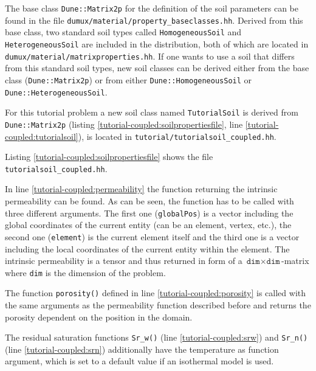 The base class \texttt{Dune::Matrix2p} for the definition of the soil
parameters can be found in the file
\texttt{dumux/material/property\_baseclasses.hh}. Derived from this
base class, two standard soil types called \texttt{HomogeneousSoil}
and \texttt{HeterogeneousSoil} are included in the \Dumux
distribution, both of which are located in
\texttt{dumux/material/matrixproperties.hh}. If one wants to use a
soil that differs from this standard soil types, new soil classes can
be derived either from the base class (\texttt{Dune::Matrix2p}) or
from either \texttt{Dune::HomogeneousSoil} or
\texttt{Dune::HeterogeneousSoil}.

For this tutorial problem a new soil class named \texttt{TutorialSoil}
is derived from \texttt{Dune::Matrix2p} (listing
\ref{tutorial-coupled:soilpropertiesfile}, line
\ref{tutorial-coupled:tutorialsoil}), is located in
\texttt{tutorial/tutorialsoil\_coupled.hh}.

Listing \ref{tutorial-coupled:soilpropertiesfile} shows the file
\texttt{tutorialsoil\_coupled.hh}.

\begin{lst}\label{tutorial-coupled:soilpropertiesfile} \mbox{}

\end{lst}

In line \ref{tutorial-coupled:permeability} the function returning the
intrinsic permeability can be found. As can be seen, the function has
to be called with three different arguments. The first one
(\texttt{globalPos}) is a vector including the global coordinates of the
current entity (can be an element, vertex, etc.), the second one
(\texttt{element}) is the current element itself and the third one is a vector
including the local coordinates of the current entity within the element. The intrinsic
permeability is a tensor and thus returned in form of a $\texttt{dim} \times
\texttt{dim}$-matrix where \texttt{dim} is the dimension of the problem.

The function \texttt{porosity()} defined in line
\ref{tutorial-coupled:porosity} is called with the same arguments as
the permeability function described before and returns the porosity
dependent on the position in the domain.

The residual saturation functions \texttt{Sr\_w()} (line
\ref{tutorial-coupled:srw}) and \texttt{Sr\_n()} (line
\ref{tutorial-coupled:srn}) additionally have the temperature as
function argument, which is set to a default value if an isothermal
model is used.

